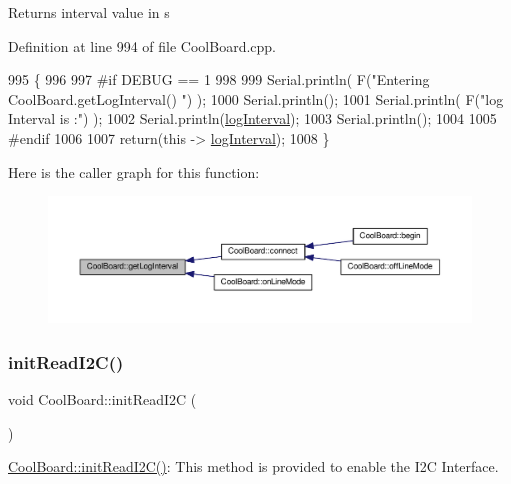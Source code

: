 \begin{DoxyReturn}{Returns}
interval value in s 
\end{DoxyReturn}


Definition at line 994 of file Cool\+Board.\+cpp.


\begin{DoxyCode}
995 \{
996 
997 \textcolor{preprocessor}{#if DEBUG == 1}
998 
999     Serial.println( F(\textcolor{stringliteral}{"Entering CoolBoard.getLogInterval() "}) );
1000     Serial.println();
1001     Serial.println( F(\textcolor{stringliteral}{"log Interval is :"}) );
1002     Serial.println(\hyperlink{class_cool_board_a84bc94413b64973e4aba8c467c97006c}{logInterval});
1003     Serial.println();
1004 
1005 \textcolor{preprocessor}{#endif}
1006 
1007     \textcolor{keywordflow}{return}(\textcolor{keyword}{this} -> \hyperlink{class_cool_board_a84bc94413b64973e4aba8c467c97006c}{logInterval});
1008 \}
\end{DoxyCode}
Here is the caller graph for this function\+:\nopagebreak
\begin{figure}[H]
\begin{center}
\leavevmode
\includegraphics[width=350pt]{d7/df9/class_cool_board_a7508e029f2ee17bb747ffab599285e0d_icgraph}
\end{center}
\end{figure}
\mbox{\label{class_cool_board_a397b46fadab8f530a8cf4d914c561366}} 
\subsubsection{\texorpdfstring{init\+Read\+I2\+C()}{initReadI2C()}}
{\footnotesize\ttfamily void Cool\+Board\+::init\+Read\+I2C (\begin{DoxyParamCaption}{ }\end{DoxyParamCaption})}

\hyperlink{class_cool_board_a397b46fadab8f530a8cf4d914c561366}{Cool\+Board\+::init\+Read\+I2\+C()}\+: This method is provided to enable the I2C Interface. 

